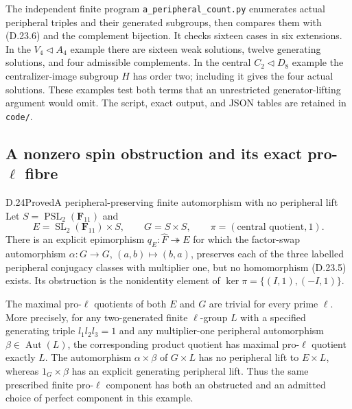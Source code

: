The independent finite program \texttt{a\_peripheral\_count.py}
enumerates actual peripheral triples and their generated subgroups,
then compares them with \textup{(D.23.6)} and the complement
bijection.  It checks sixteen cases in six extensions.  In the
$V_4\triangleleft A_4$ example there are sixteen weak solutions,
twelve generating solutions, and four admissible complements.  In
the central $C_2\triangleleft D_8$ example the centralizer-image
subgroup $H$ has order two; including it gives the four actual
solutions.  These examples test both terms that an unrestricted
generator-lifting argument would omit.  The script, exact output,
and JSON tables are retained in \texttt{code/}.

\subsection{A nonzero spin obstruction and its exact pro-$\ell$ fibre}

\begin{statement}{D.24}{Proved}{A peripheral-preserving finite automorphism with no peripheral lift}
Let $S=\operatorname{PSL}_2(\mathbf F_{11})$ and
\[
 E=\operatorname{SL}_2(\mathbf F_{11})\times S,
 \qquad G=S\times S,
 \qquad\pi=(\text{central quotient},1).
 \tag{D.24.1}
\]
There is an explicit epimorphism $q_E:\widehat F\twoheadrightarrow E$
for which the factor-swap automorphism
$\alpha:G\to G$, $(a,b)\mapsto(b,a)$, preserves each of the
three labelled peripheral conjugacy classes with multiplier one,
but no homomorphism \textup{(D.23.5)} exists.  Its obstruction is
the nonidentity element of $\ker\pi=\{(I,1),(-I,1)\}$.

The maximal pro-$\ell$ quotients of both $E$ and $G$ are trivial
for every prime $\ell$.  More precisely, for any two-generated
finite $\ell$-group $L$ with a specified generating triple
$l_1l_2l_3=1$ and any multiplier-one peripheral automorphism
$\beta\in\operatorname{Aut}(L)$, the corresponding product
quotient has maximal pro-$\ell$ quotient exactly $L$.
The automorphism $\alpha\times\beta$ of $G\times L$ has no
peripheral lift to $E\times L$, whereas $1_G\times\beta$ has
an explicit generating peripheral lift.  Thus the same prescribed
finite pro-$\ell$ component has both an obstructed and an admitted
choice of perfect component in this example.
\end{statement}

